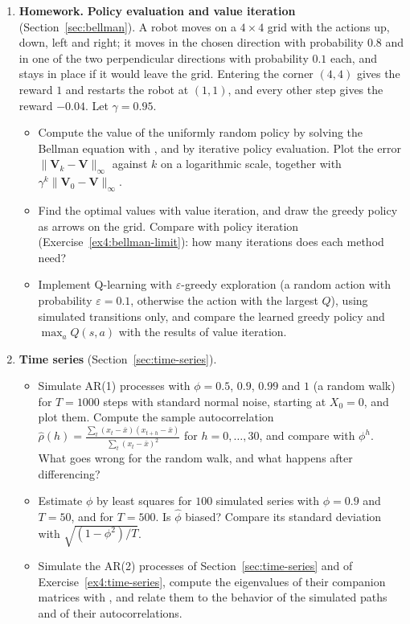 \documentclass[11pt]{article}
\newcommand{\homework}{\textcolor{red!70!black}{\textbf{Homework.}}}
\newcommand{\py}[1]{\texttt{\detokenize{#1}}}
\newcommand{\norm}[1]{\lVert #1 \rVert}
\theoremstyle{definition}
\theoremstyle{plain}
\theoremstyle{remark}
\begin{document}
\begin{enumerate}[label=\textbf{P\arabic*.}, leftmargin=*]
    \item \homework{} \textbf{Policy evaluation and value iteration} (Section~\ref{sec:bellman}). A robot moves on a $4 \times 4$ grid with the actions up, down, left and right; it moves in the chosen direction with probability $0.8$ and in one of the two perpendicular directions with probability $0.1$ each, and stays in place if it would leave the grid. Entering the corner $(4, 4)$ gives the reward $1$ and restarts the robot at $(1, 1)$, and every other step gives the reward $-0.04$. Let $\gamma = 0.95$.
    \begin{itemize}
        \item Compute the value of the uniformly random policy by solving the Bellman equation with \py{np.linalg.solve}, and by iterative policy evaluation. Plot the error $\norm{\mathbf{V}_k - \mathbf{V}}_\infty$ against $k$ on a logarithmic scale, together with $\gamma^k\norm{\mathbf{V}_0 - \mathbf{V}}_\infty$.
        \item Find the optimal values with value iteration, and draw the greedy policy as arrows on the grid. Compare with policy iteration (Exercise~\ref{ex4:bellman-limit}): how many iterations does each method need?
        \item Implement Q-learning with $\varepsilon$-greedy exploration (a random action with probability $\varepsilon = 0.1$, otherwise the action with the largest $Q$), using simulated transitions only, and compare the learned greedy policy and $\max_a Q(s, a)$ with the results of value iteration.
    \end{itemize}

    \item \textbf{Time series} (Section~\ref{sec:time-series}).
    \begin{itemize}
        \item Simulate AR(1) processes with $\phi = 0.5$, $0.9$, $0.99$ and $1$ (a random walk) for $T = 1000$ steps with standard normal noise, starting at $X_0 = 0$, and plot them. Compute the sample autocorrelation $\hat\rho(h) = \frac{\sum_t (x_t - \bar x)(x_{t+h} - \bar x)}{\sum_t (x_t - \bar x)^2}$ for $h = 0, \ldots, 30$, and compare with $\phi^h$. What goes wrong for the random walk, and what happens after differencing?
        \item Estimate $\phi$ by least squares for $100$ simulated series with $\phi = 0.9$ and $T = 50$, and for $T = 500$. Is $\hat\phi$ biased? Compare its standard deviation with $\sqrt{(1 - \phi^2)/T}$.
        \item Simulate the AR(2) processes of Section~\ref{sec:time-series} and of Exercise~\ref{ex4:time-series}, compute the eigenvalues of their companion matrices with \py{np.linalg.eigvals}, and relate them to the behavior of the simulated paths and of their autocorrelations.
    \end{itemize}


\end{enumerate}
\end{document}
